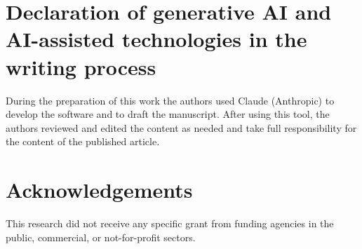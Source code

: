 \documentclass[preprint,12pt]{elsarticle}
\begin{document}
\section*{Declaration of generative AI and AI-assisted technologies in the
writing process}
During the preparation of this work the authors used Claude (Anthropic) to
develop the software and to draft the manuscript. After using this tool,
the authors reviewed and edited the content as needed and take full
responsibility for the content of the published article.

\section*{Acknowledgements}
This research did not receive any specific grant from funding agencies in
the public, commercial, or not-for-profit sectors.



\end{document}
